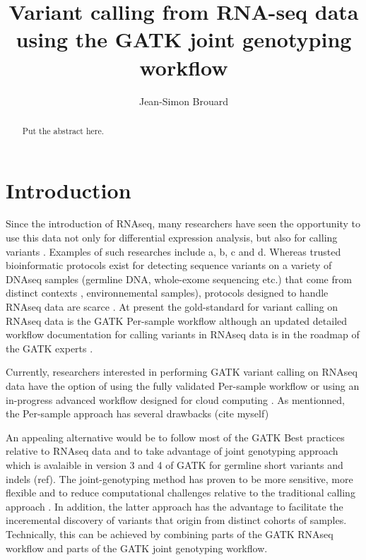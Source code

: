 \documentclass[]{article}
\title{Variant calling from RNA-seq data using the GATK joint genotyping workflow}
\author{Jean-Simon Brouard}
\begin{document}
\maketitle

\begin{abstract}
Put the abstract here.
\end{abstract}

\section{Introduction}
Since the introduction of RNAseq, many researchers have seen the opportunity to use this data not only for differential expression analysis, but also for calling variants \cite{Piskol2013}. Examples of such researches include a, b, c and d. Whereas trusted bioinformatic protocols exist for detecting sequence variants on a variety of DNAseq samples (germline DNA, whole-exome sequencing etc.) that come from distinct contexts \cite{Koboldt2020}, environnemental samples), protocols designed to handle RNAseq data are scarce \cite{Piskol2013}. At present the gold-standard for variant calling on RNAseq data is the GATK Per-sample workflow although an updated detailed workflow documentation for calling variants in RNAseq data is in the roadmap of the GATK experts \cite{GATK_best_RNAseq}.


Currently, researchers interested in performing GATK variant calling on RNAseq data have the option of using the fully validated Per-sample workflow \cite{GATK_RNAseq_variant_discovery} or using an in-progress advanced workflow designed for cloud computing \cite{GATK_gatk4_rnaseq_github}.
As mentionned, the Per-sample approach has several drawbacks (cite myself)

An appealing alternative would be to follow most of the GATK Best practices relative to RNAseq data and to take advantage of joint genotyping approach which is avalaible in version 3 and 4 of GATK for germline short variants and indels (ref). The joint-genotyping method has proven to be more sensitive, more flexible and to reduce computational challenges relative to the traditional calling approach \cite{GATK_jointCalling_1}. In addition, the latter approach has the advantage to facilitate the inceremental discovery of variants that origin from distinct cohorts of samples. Technically, this can be achieved by combining parts of the GATK RNAseq workflow and parts of the GATK joint genotyping workflow.
\end{document}
